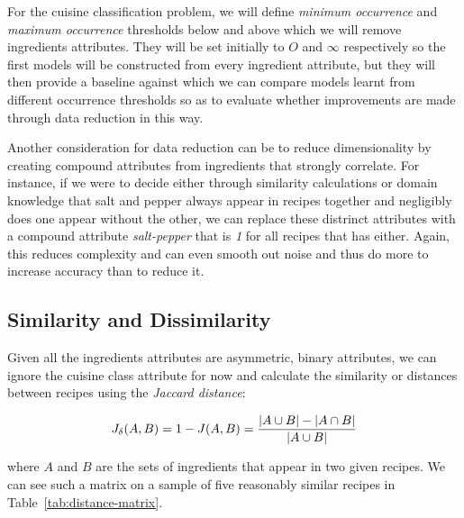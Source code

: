 \documentclass[11pt,a4paper]{article}
\begin{document}
For the cuisine classification problem, we will define \emph{minimum occurrence}
and \emph{maximum occurrence} thresholds below and above which we will remove
ingredients attributes. They will be set initially to $O$ and $\infty$
respectively so the first models will be constructed from every ingredient
attribute, but they will then provide a baseline against which we can compare
models learnt from different occurrence thresholds so as to evaluate whether
improvements are made through data reduction in this way.

Another consideration for data reduction can be to reduce dimensionality by creating
compound attributes from ingredients that strongly correlate. For instance, if
we were to decide either through similarity calculations or domain knowledge
that salt and pepper always appear in recipes together and negligibly does
one appear without the other, we can replace these distrinct attributes with a compound
attribute \emph{salt-pepper} that is \emph{1} for all recipes that has either.
Again, this reduces complexity and can even smooth out noise \cite{han2006data} and
thus do more to increase accuracy than to reduce it.

\subsection{Similarity and Dissimilarity}
\label{sec:distances}
Given all the ingredients attributes are asymmetric, binary attributes, we can ignore
the cuisine class attribute for now and calculate the similarity or distances
between recipes using the \emph{Jaccard distance}: \cite{han2006data}

\begin{equation}
J_{\delta}(A,B) = 1 - J(A,B) = { { |A \cup B| - |A \cap B| } \over |A \cup B| }
\end{equation}

\noindent where $A$ and $B$ are the sets of ingredients that appear in two given
recipes. We can see such a matrix on a sample of five reasonably similar recipes
in Table~\ref{tab:distance-matrix}.

\end{document}
